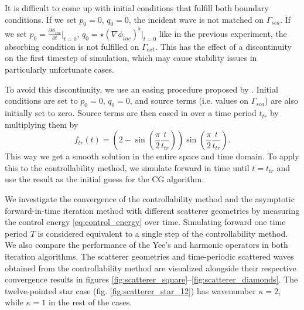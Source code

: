 \documentclass[utf8,english]{gradu3}
\begin{document}
It is difficult to come up with initial conditions
that fulfill both boundary conditions. 
If we set $p_0 = 0$, $q_0 = 0$, the incident wave is not matched on $\Gamma_{sca}$.
If we set $p_0 = \frac{\partial \phi_{inc}}{\partial t} \Big|_{t=0}$,
$q_0 = \star (\nabla \phi_{inc})^{\flat} \Big|_{t=0}$
like in the previous experiment, the absorbing condition
is not fulfilled on $\Gamma_{ext}$.
This has the effect of a discontinuity on the first timestep of simulation,
which may cause stability issues in particularly unfortunate cases.

To avoid this discontinuity, we use an easing procedure
proposed by \textcite{mur_finite-element_1993}.
Initial conditions are set to $p_0 = 0$, $q_0 = 0$,
and source terms (i.e. values on $\Gamma_{sca}$)
are also initially set to zero.
Source terms are then eased in over a time period $t_{tr}$
by multiplying them by
\begin{equation}\label{eq:mur_transition}
  f_{tr}(t) = (2 - \sin(\frac{\pi}{2} \frac{t}{t_{tr}}))\sin(\frac{\pi}{2} \frac{t}{t_{tr}}).
\end{equation}
This way we get a smooth solution in the entire space and time domain.
To apply this to the controllability method,
we simulate forward in time until $t = t_{tr}$
and use the result as the initial guess for the CG algorithm.

We investigate the convergence of the controllability method
and the asymptotic forward-in-time iteration method
with different scatterer geometries
by measuring the control energy \eqref{eq:control_energy} over time.
Simulating forward one time period $T$ is considered equivalent
to a single step of the controllability method.
We also compare the performance of the Yee's and harmonic operators
in both iteration algorithms.
The scatterer geometries and time-periodic scattered waves
obtained from the controllability method are visualized 
alongside their respective convergence results in figures
\ref{fig:scatterer_square}--\ref{fig:scatterer_diamonds}.
The twelve-pointed star case (fig. \ref{fig:scatterer_star_12})
has wavenumber $\kappa = 2$, while $\kappa = 1$ in the rest of the cases.
\end{document}
